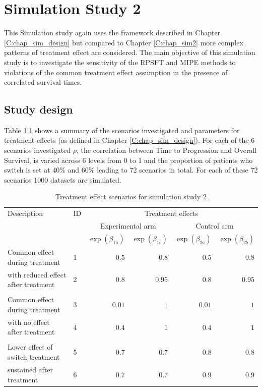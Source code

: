 \chapter{Simulation Study 2}
\label{C:chap_sim3}

This Simulation study again uses the framework described in Chapter \ref{C:chap_sim_design} but compared to Chapter \ref{C:chap_sim2} more complex patterns of treatment effect are considered. The main objective of this simulation study is to investigate the sensitivity of the RPSFT and MIPE methods to violations of the common treatment effect assumption in the presence of correlated survival times.

\section{Study design}

Table \ref{T:chap_sim3:scenarios} shows a summary of the scenarios investigated and parameters for treatment effects (as defined in Chapter \ref{C:chap_sim_design}). For each of the 6 scenarios investigated $\rho$, the correlation between Time to Progression and Overall Survival, is varied across 6 levels from 0 to 1 and the proportion of patients who switch is set at 40\% and 60\% leading to 72 scenarios in total. For each of these 72 scenarios 1000 datasets are simulated. 

\begin{table}[ht] 
\caption{Treatment effect scenarios for simulation study 2}
\centering 
\begin{tabular}{ l l r r r r}
\hline
\hline
Description & ID & \multicolumn{4}{c}{Treatment effects} \\
         &             & \multicolumn{2}{c}{Experimental arm} & \multicolumn{2}{c}{Control arm} \\
		 &             & $\exp(\beta_{1a})$ & $\exp(\beta_{1b})$ & $\exp(\beta_{2a})$ & $\exp(\beta_{2b})$ \\
\hline
Common effect during treatment      & 1 & $0.5$ & $0.8$ & $0.5$ & $0.8$ \\
with reduced effect after treatment & 2 & $0.8$ & $0.95$ & $0.8$ & $0.95$ \\            
\\
Common effect during treatment     & 3 & $0.01$ & $1$ & $0.01$ & $1$ \\
with no effect after treatment     & 4 & $0.4$  & $1$ & $0.4$ & $1$ \\
\\
Lower effect of switch treatment & 5 & $0.7$ & $0.7$ & $0.8$ & $0.8$ \\
sustained after treatment        & 6 & $0.7$ & $0.7$ & $0.9$ & $0.9$ \\
\hline
\end{tabular} 
\label{T:chap_sim3:scenarios}
\end{table}



